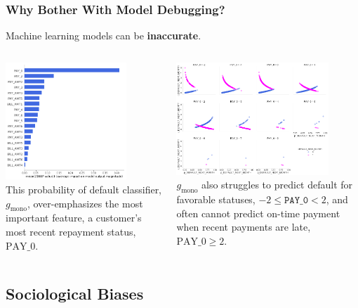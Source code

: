 \documentclass[11pt,
               aspectratio=43,
               hyperref={colorlinks}
               ]{beamer}
\begin{document}
			\begin{frame}
		
				\frametitle{Why Bother With Model Debugging?}
		
					\footnotesize{Machine learning models can be \textbf{inaccurate}.}
					\begin{columns}
				
						\centering
						\includegraphics[height=125pt]{img/global_shap.png}\\
						\vspace{5pt}
						\tiny{This probability of default classifier, $g_{\text{mono}}$, over-emphasizes the most important feature, a customer's most recent repayment status, $\text{PAY\_0}$.}
				
						\centering
						\vspace{9pt}
						\includegraphics[height=120pt]{img/resid.png}\\
						\vspace{8pt}
						\tiny{$g_{\text{mono}}$ also struggles to predict default for favorable statuses, $-2  \leq \texttt{PAY\_0}  < 2$, and often cannot predict on-time payment when recent payments are late, $\text{PAY\_0} \geq 2$}.
				
					\end{columns}
					\normalsize
			
			\end{frame}
	
		\subsection{Sociological Biases}
	
\end{document}
